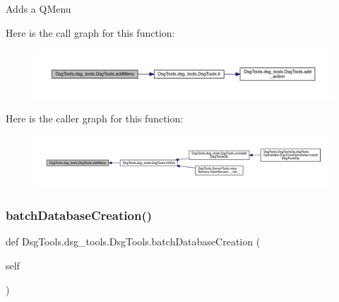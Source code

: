 \begin{DoxyVerb}Adds a QMenu
\end{DoxyVerb}
 Here is the call graph for this function\+:
\nopagebreak
\begin{figure}[H]
\begin{center}
\leavevmode
\includegraphics[width=350pt]{class_dsg_tools_1_1dsg__tools_1_1_dsg_tools_a341a80ad74714899d12af02121495604_cgraph}
\end{center}
\end{figure}
Here is the caller graph for this function\+:
\nopagebreak
\begin{figure}[H]
\begin{center}
\leavevmode
\includegraphics[width=350pt]{class_dsg_tools_1_1dsg__tools_1_1_dsg_tools_a341a80ad74714899d12af02121495604_icgraph}
\end{center}
\end{figure}
\mbox{\label{class_dsg_tools_1_1dsg__tools_1_1_dsg_tools_a8a9507bd642a3a8774e32fcf9f66f45d}} 
\subsubsection{\texorpdfstring{batch\+Database\+Creation()}{batchDatabaseCreation()}}
{\footnotesize\ttfamily def Dsg\+Tools.\+dsg\+\_\+tools.\+Dsg\+Tools.\+batch\+Database\+Creation (\begin{DoxyParamCaption}\item[{}]{self }\end{DoxyParamCaption})}

